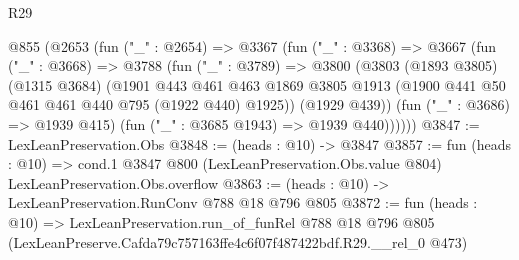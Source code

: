 \begin{lexlean}{R29}
\begin{coremodule}
  @855
    (@2653
      (fun ("_" : @2654) =>
      @3367
        (fun ("_" : @3368) =>
        @3667
          (fun ("_" : @3668) =>
          @3788
            (fun ("_" : @3789) =>
            @3800
              (@3803
                (@1893 @3805)
                (@1315 @3684)
                (@1901
                  @443
                  @461
                  @463
                  @1869
                  @3805
                  @1913
                  (@1900 @441 @50 @461 @461 @440 @795 (@1922 @440) @1925))
                (@1929 @439))
              (fun ("_" : @3686) => @1939 @415)
              (fun ("_" : @3685 @1943) => @1939 @440))))))
@3847 := LexLeanPreservation.Obs
@3848 := (heads : @10) -> @3847
@3857 := fun (heads : @10) =>
  cond.{1} @3847 @800 (LexLeanPreservation.Obs.value @804) LexLeanPreservation.Obs.overflow
@3863 := (heads : @10) -> LexLeanPreservation.RunConv @788 @18 @796 @805
@3872 := fun (heads : @10) =>
  LexLeanPreservation.run_of_funRel
    @788
    @18
    @796
    @805
    (LexLeanPreserve.Cafda79c757163ffe4c6f07f487422bdf.R29.__rel_0 @473)
\end{coremodule}
\end{lexlean}
